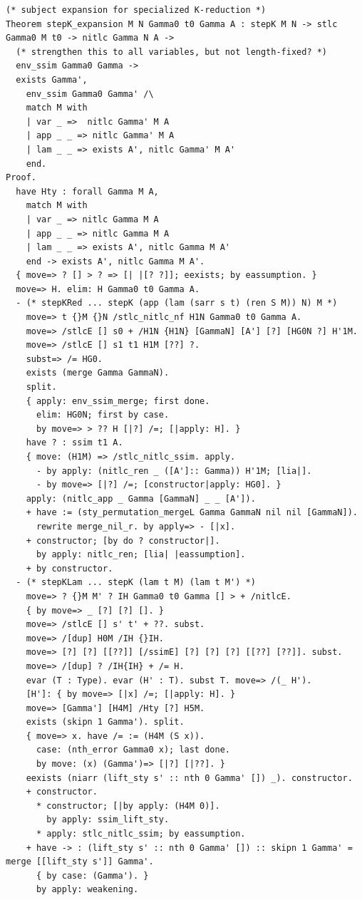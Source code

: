 \begin{lstlisting}[style=authorcoq]
(* subject expansion for specialized K-reduction *)
Theorem stepK_expansion M N Gamma0 t0 Gamma A : stepK M N -> stlc Gamma0 M t0 -> nitlc Gamma N A ->
  (* strengthen this to all variables, but not length-fixed? *)
  env_ssim Gamma0 Gamma ->
  exists Gamma',
    env_ssim Gamma0 Gamma' /\
    match M with
    | var _ =>  nitlc Gamma' M A
    | app _ _ => nitlc Gamma' M A
    | lam _ _ => exists A', nitlc Gamma' M A'
    end.
Proof.
  have Hty : forall Gamma M A,
    match M with
    | var _ => nitlc Gamma M A
    | app _ _ => nitlc Gamma M A
    | lam _ _ => exists A', nitlc Gamma M A'
    end -> exists A', nitlc Gamma M A'.
  { move=> ? [] > ? => [| |[? ?]]; eexists; by eassumption. }
  move=> H. elim: H Gamma0 t0 Gamma A.
  - (* stepKRed ... stepK (app (lam (sarr s t) (ren S M)) N) M *)
    move=> t {}M {}N /stlc_nitlc_nf H1N Gamma0 t0 Gamma A.
    move=> /stlcE [] s0 + /H1N {H1N} [GammaN] [A'] [?] [HG0N ?] H'1M.
    move=> /stlcE [] s1 t1 H1M [??] ?.
    subst=> /= HG0.
    exists (merge Gamma GammaN).
    split.
    { apply: env_ssim_merge; first done.
      elim: HG0N; first by case.
      by move=> > ?? H [|?] /=; [|apply: H]. }
    have ? : ssim t1 A.
    { move: (H1M) => /stlc_nitlc_ssim. apply.
      - by apply: (nitlc_ren _ ([A']:: Gamma)) H'1M; [lia|].
      - by move=> [|?] /=; [constructor|apply: HG0]. }
    apply: (nitlc_app _ Gamma [GammaN] _ _ [A']).
    + have := (sty_permutation_mergeL Gamma GammaN nil nil [GammaN]).
      rewrite merge_nil_r. by apply=> - [|x].
    + constructor; [by do ? constructor|].
      by apply: nitlc_ren; [lia| |eassumption].
    + by constructor.
  - (* stepKLam ... stepK (lam t M) (lam t M') *)
    move=> ? {}M M' ? IH Gamma0 t0 Gamma [] > + /nitlcE.
    { by move=> _ [?] [?] []. }
    move=> /stlcE [] s' t' + ??. subst.
    move=> /[dup] H0M /IH {}IH.
    move=> [?] [?] [[??]] [/ssimE] [?] [?] [?] [[??] [??]]. subst.
    move=> /[dup] ? /IH{IH} + /= H.
    evar (T : Type). evar (H' : T). subst T. move=> /(_ H').
    [H']: { by move=> [|x] /=; [|apply: H]. }
    move=> [Gamma'] [H4M] /Hty [?] H5M.
    exists (skipn 1 Gamma'). split.
    { move=> x. have /= := (H4M (S x)).
      case: (nth_error Gamma0 x); last done.
      by move: (x) (Gamma')=> [|?] [|??]. }
    eexists (niarr (lift_sty s' :: nth 0 Gamma' []) _). constructor.
    + constructor.
      * constructor; [|by apply: (H4M 0)].
        by apply: ssim_lift_sty.
      * apply: stlc_nitlc_ssim; by eassumption.
    + have -> : (lift_sty s' :: nth 0 Gamma' []) :: skipn 1 Gamma' = merge [[lift_sty s']] Gamma'.
      { by case: (Gamma'). }
      by apply: weakening.

\end{lstlisting}
